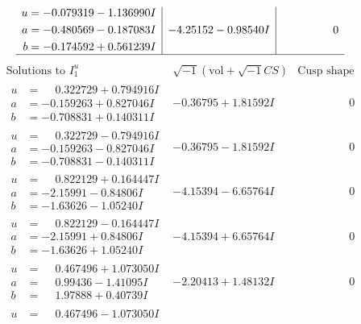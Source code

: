 \documentclass[1p]{elsarticle_modified}
\theoremstyle{definition}
\newcommand{\I}{\sqrt{-1}}
\begin{document}
$$\begin{array}{c|c|c}
\begin{aligned}
u &= -0.079319 - 1.136990 I \\
a &= -0.480569 - 0.187083 I \\
b &= -0.174592 + 0.561239 I\end{aligned}
 & -4.25152 - 0.98540 I & \phantom{-0.000000 } 0\\
 \hline 
 \end{array}$$\newpage$$\begin{array}{c|c|c}  
\text{Solutions to }I^u_{1}& \I (\text{vol} + \sqrt{-1}CS) & \text{Cusp shape}\\
 \hline 
\begin{aligned}
u &= \phantom{-}0.322729 + 0.794916 I \\
a &= -0.159263 + 0.827046 I \\
b &= -0.708831 + 0.140311 I\end{aligned}
 & -0.36795 + 1.81592 I & \phantom{-0.000000 } 0 \\ \hline\begin{aligned}
u &= \phantom{-}0.322729 - 0.794916 I \\
a &= -0.159263 - 0.827046 I \\
b &= -0.708831 - 0.140311 I\end{aligned}
 & -0.36795 - 1.81592 I & \phantom{-0.000000 } 0 \\ \hline\begin{aligned}
u &= \phantom{-}0.822129 + 0.164447 I \\
a &= -2.15991 - 0.84806 I \\
b &= -1.63626 - 1.05240 I\end{aligned}
 & -4.15394 - 6.65764 I & \phantom{-0.000000 } 0 \\ \hline\begin{aligned}
u &= \phantom{-}0.822129 - 0.164447 I \\
a &= -2.15991 + 0.84806 I \\
b &= -1.63626 + 1.05240 I\end{aligned}
 & -4.15394 + 6.65764 I & \phantom{-0.000000 } 0 \\ \hline\begin{aligned}
u &= \phantom{-}0.467496 + 1.073050 I \\
a &= \phantom{-}0.99436 - 1.41095 I \\
b &= \phantom{-}1.97888 + 0.40739 I\end{aligned}
 & -2.20413 + 1.48132 I & \phantom{-0.000000 } 0 \\ \hline\begin{aligned}
u &= \phantom{-}0.467496 - 1.073050 I \\

\end{aligned}
\end{array}$$
\end{document}
